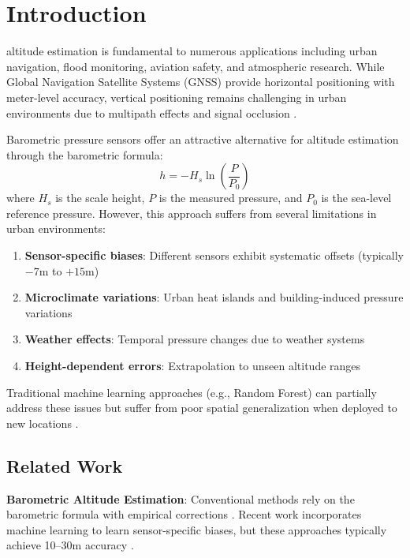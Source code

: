 \section{Introduction}
\label{sec:intro}

 altitude estimation is fundamental to numerous applications including urban navigation, flood monitoring, aviation safety, and atmospheric research. While Global Navigation Satellite Systems (GNSS) provide horizontal positioning with meter-level accuracy, vertical positioning remains challenging in urban environments due to multipath effects and signal occlusion \cite{groves2013principles}.

Barometric pressure sensors offer an attractive alternative for altitude estimation through the barometric formula:
\begin{equation}
h = -H_s \ln\left(\frac{P}{P_0}\right)
\end{equation}
where $H_s$ is the scale height, $P$ is the measured pressure, and $P_0$ is the sea-level reference pressure. However, this approach suffers from several limitations in urban environments:

\begin{enumerate}
    \item \textbf{Sensor-specific biases}: Different sensors exhibit systematic offsets (typically $-7$m to $+15$m)
    \item \textbf{Microclimate variations}: Urban heat islands and building-induced pressure variations
    \item \textbf{Weather effects}: Temporal pressure changes due to weather systems
    \item \textbf{Height-dependent errors}: Extrapolation to unseen altitude ranges
\end{enumerate}

Traditional machine learning approaches (e.g., Random Forest) can partially address these issues but suffer from poor spatial generalization when deployed to new locations \cite{zhang2020urban}.

\subsection{Related Work}

\textbf{Barometric Altitude Estimation}: Conventional methods rely on the barometric formula with empirical corrections \cite{icao1993manual}. Recent work incorporates machine learning to learn sensor-specific biases, but these approaches typically achieve 10--30m accuracy \cite{zhang2020urban}.

